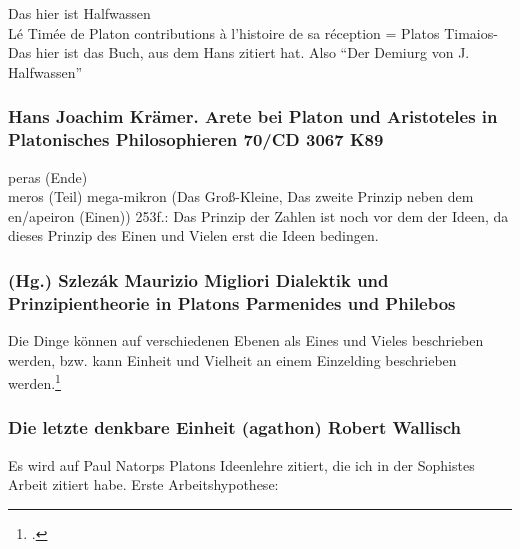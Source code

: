 Das hier ist Halfwassen\\
Lé Timée de Platon contributions à l'histoire de sa réception = Platos Timaios- Das hier ist das Buch, aus dem Hans zitiert hat. Also \enquote{Der Demiurg von J. Halfwassen}
\subsubsection*{Hans Joachim Krämer. Arete bei Platon und Aristoteles in Platonisches Philosophieren 70/CD 3067 K89}
peras (Ende)\\
meros (Teil)
mega-mikron (Das Groß-Kleine, Das zweite Prinzip neben dem en/apeiron (Einen))
253f.: Das Prinzip der Zahlen ist noch vor dem der Ideen, da dieses Prinzip des Einen und Vielen erst die Ideen bedingen. 

\subsubsection*{(Hg.) Szlezák Maurizio Migliori Dialektik und Prinzipientheorie in Platons Parmenides und Philebos}
Die Dinge können auf verschiedenen Ebenen als Eines und Vieles beschrieben werden, bzw. kann Einheit und Vielheit an einem Einzelding beschrieben werden.\footcite[vgl.][S. 112]{Migliori}

\subsubsection*{Die letzte denkbare Einheit (agathon) Robert Wallisch}
Es wird auf Paul Natorps Platons Ideenlehre zitiert, die ich in der Sophistes Arbeit zitiert habe. 
Erste Arbeitshypothese: 

